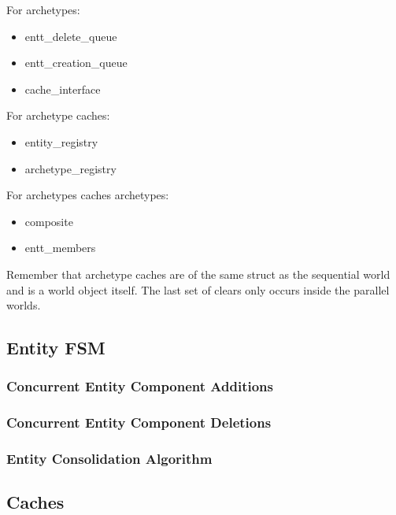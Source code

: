 For archetypes:
\begin{itemize}
    \item entt\_delete\_queue
    \item entt\_creation\_queue
    \item cache\_interface
\end{itemize}

For archetype caches:
\begin{itemize}
    \item entity\_registry
    \item archetype\_registry
\end{itemize}

For archetypes caches archetypes:
\begin{itemize}
    \item composite
    \item entt\_members
\end{itemize}

Remember that archetype caches are of the same struct as the sequential world and is a world object itself. The last set of clears only occurs inside the parallel worlds.

\subsection{Entity FSM}

\subsubsection{Concurrent Entity Component Additions}
\subsubsection{Concurrent Entity Component Deletions}
\subsubsection{Entity Consolidation Algorithm}

\subsection{Caches}

